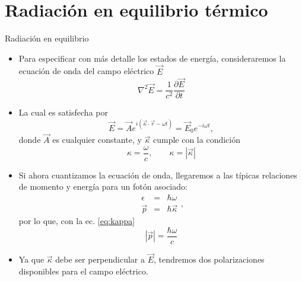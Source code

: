 \documentclass[aspectratio=1610]{beamer}
\newcommand{\Ev}{\Vec{E}}
\newcommand{\kv}{\Vec{\kappa}}
\begin{document}
\section{Radiación en equilibrio térmico}
\begin{frame}{Radiación en equilibrio}
	\begin{itemize}
		\item Para especificar con más detalle los estados de energía, consideraremos la ecuación de onda del campo eléctrico $\Ev$
		\begin{equation}
			\nabla^2\Ev=\frac{1}{c^2}\frac{\partial \Ev}{\partial t}
			\label{eq:EWave}
		\end{equation}\pause
		\item La cual es satisfecha por
		\begin{equation}
			\Ev = \Vec{A} e^{i (\kv\cdot\Vec{r}-\omega t)} = \Ev_0 e^{-i \omega t},
			\label{eq:ESol}
		\end{equation}
		donde $\Vec{A}$ es cualquier constante, y $\kv$ cumple con la condición
		\begin{equation}
			\kappa = \frac{\omega}{c}, \qquad \kappa = |\kv|
			\label{eq:kappa}
		\end{equation}
	\end{itemize}
\end{frame}

\begin{frame}
	\begin{itemize}
		\item Si ahora cuantizamos la ecuación de onda, llegaremos a las típicas relaciones de momento y energía para un fotón asociado:
		\begin{equation}
			\begin{array}{rcl}
				\epsilon &=& \hbar \omega  \\
				\Vec{p} &=& \hbar \kv 
			\end{array},
			\label{eq:EMom}
		\end{equation}
		por lo que, con la ec. \ref{eq:kappa}
		\begin{equation}
			|\Vec{p}| = \frac{\hbar \omega}{c}
		\end{equation}\pause
		\item Ya que $\kv$ debe ser perpendicular a $\Ev$, tendremos dos polarizaciones disponibles para el campo eléctrico.
	\end{itemize}
\end{frame}
\end{document}
